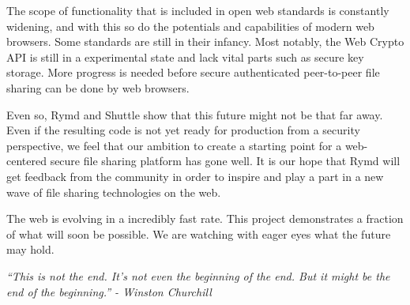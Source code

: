 The scope of functionality that is included in open web standards is constantly widening, and with this so do the potentials and capabilities of modern web browsers. Some standards are still in their infancy. Most notably, the Web Crypto API is still in a experimental state and lack vital parts such as secure key storage. More progress is needed before secure authenticated peer-to-peer file sharing can be done by web browsers.

Even so, Rymd and Shuttle show that this future might not be that far away. Even if the resulting code is not yet ready for production from a security perspective, we feel that our ambition to create a starting point for a web-centered secure file sharing platform has gone well. It is our hope that Rymd will get feedback from the community in order to inspire and play a part in a new wave of file sharing technologies on the web.

The web is evolving in a incredibly fast rate. This project demonstrates a fraction of what will soon be possible. We are watching with eager eyes what the future may hold.

\emph{``This is not the end. It's not even the beginning of the end. But it might be the end of the beginning.'' - Winston Churchill}
